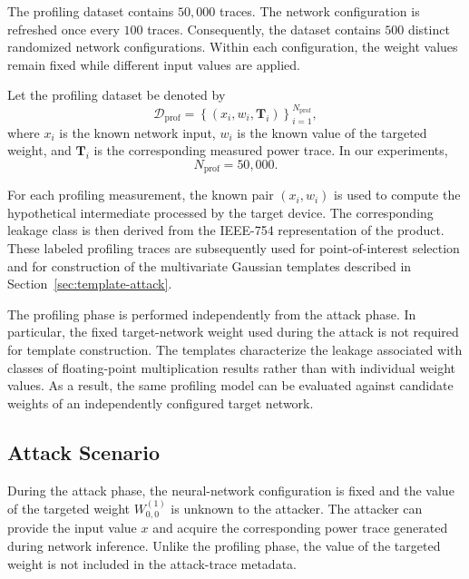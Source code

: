 \documentclass[conference]{IEEEtran}
\begin{document}
The profiling dataset contains $50{,}000$ traces.
The network configuration is refreshed once every $100$ traces.
Consequently, the dataset contains $500$ distinct randomized network configurations.
Within each configuration, the weight values remain fixed while different input values are applied.

Let the profiling dataset be denoted by
\begin{equation*}
	\mathcal{D}_{\mathrm{prof}}
	=
	\left\{
	\left(
	x_i,
	w_i,
	\mathbf{T}_i
	\right)
	\right\}_{i=1}^{N_{\mathrm{prof}}},
\end{equation*}
where $x_i$ is the known network input, $w_i$ is the known value of the targeted weight, and $\mathbf{T}_i$ is the corresponding measured power trace.
In our experiments,
\begin{equation*}
	N_{\mathrm{prof}} = 50{,}000.
\end{equation*}

For each profiling measurement, the known pair $(x_i,w_i)$ is used to compute the hypothetical intermediate processed by the target device.
The corresponding leakage class is then derived from the IEEE-754 representation of the product.
These labeled profiling traces are subsequently used for point-of-interest selection and for construction of the multivariate Gaussian templates described in Section~\ref{sec:template-attack}.

The profiling phase is performed independently from the attack phase.
In particular, the fixed target-network weight used during the attack is not required for template construction.
The templates characterize the leakage associated with classes of floating-point multiplication results rather than with individual weight values.
As a result, the same profiling model can be evaluated against candidate weights of an independently configured target network.

\subsection{Attack Scenario}
\label{sec:attack-scenario}

During the attack phase, the neural-network configuration is fixed and the value of the targeted weight $W^{(1)}_{0,0}$ is unknown to the attacker.
The attacker can provide the input value $x$ and acquire the corresponding power trace generated during network inference.
Unlike the profiling phase, the value of the targeted weight is not included in the attack-trace metadata.
\end{document}
